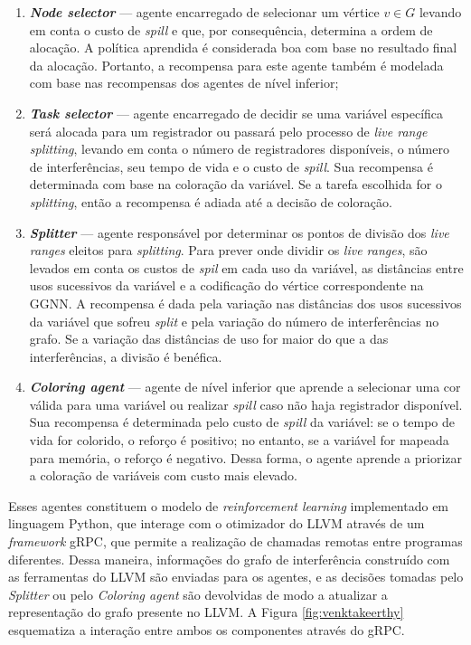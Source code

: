\documentclass[
	12pt,				%
	openright,			%
	twoside,			%
	a4paper,			%
	tcc,			%
	]{ABNT-DC-UEL}
\begin{document}
\begin{enumerate}
    \item \textbf{\textit{Node selector}} --- agente encarregado de selecionar um vértice $v \in G$ levando em conta o custo de \textit{spill} e que, por consequência, determina a ordem de alocação. A política aprendida é considerada boa com base no resultado final da alocação. Portanto, a recompensa para este agente também é modelada com base nas recompensas dos agentes de nível inferior;

    \item \textbf{\textit{Task selector}} --- agente encarregado de decidir se uma variável específica será alocada para um registrador ou passará pelo processo de \textit{live range splitting}, levando em conta o número de registradores disponíveis, o número de interferências, seu tempo de vida e o custo de \textit{spill}. Sua recompensa é determinada com base na coloração da variável. Se a tarefa escolhida for o \textit{splitting}, então a recompensa é adiada até a decisão de coloração.

    \item \textbf{\textit{Splitter}} --- agente responsável por determinar os pontos de divisão dos \textit{live ranges} eleitos para \textit{splitting}. Para prever onde dividir os \textit{live ranges}, são levados em conta os custos de \textit{spil} em cada uso da variável, as distâncias entre usos sucessivos da variável e a codificação do vértice correspondente na GGNN. A recompensa é dada pela variação nas distâncias dos usos sucessivos da variável que sofreu \textit{split} e pela variação do número de interferências no grafo. Se a variação das distâncias de uso for maior do que a das interferências, a divisão é benéfica.

    \item \textbf{\textit{Coloring agent}} --- agente de nível inferior que aprende a selecionar uma cor válida para uma variável ou realizar \textit{spill} caso não haja registrador disponível. Sua recompensa é determinada pelo custo de \textit{spill} da variável: se o tempo de vida for colorido, o reforço é positivo; no entanto, se a variável for mapeada para memória, o reforço é negativo. Dessa forma, o agente aprende a priorizar a coloração de variáveis com custo mais elevado.
\end{enumerate}

Esses agentes constituem o modelo de \textit{reinforcement learning} implementado em linguagem Python, que interage com o otimizador do LLVM através de um \textit{framework} gRPC, que permite a realização de chamadas remotas entre programas diferentes. Dessa maneira, informações do grafo de interferência construído com as ferramentas do LLVM são enviadas para os agentes, e as decisões tomadas pelo \textit{Splitter} ou pelo \textit{Coloring agent} são devolvidas de modo a atualizar a representação do grafo presente no LLVM. A Figura \ref{fig:venktakeerthy} esquematiza a interação entre ambos os componentes através do gRPC.
\end{document}
